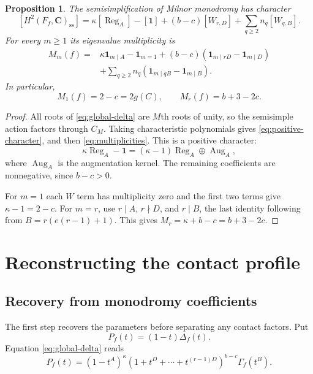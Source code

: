 \documentclass[11pt]{article}
\numberwithin{equation}{section}
\newtheorem{proposition}[theorem]{Proposition}
\theoremstyle{definition}
\theoremstyle{remark}
\newcommand{\CC}{\mathbf C}
\newcommand{\one}{\mathbf 1}
\newcommand{\Reg}{\operatorname{Reg}}
\newcommand{\Aug}{\operatorname{Aug}}
\begin{document}
\begin{proposition}\label{prop:characters}
The semisimplification of Milnor monodromy has character
\begin{equation}\label{eq:positive-character}
 [H^2(F_f,\CC)_{\mathrm{ss}}]
   =\kappa[\Reg_A]-[\one]+(b-c)[W_{r,D}]
                 +\sum_{q\ge2}n_q[W_{q,B}].
\end{equation}
For every $m\ge1$ its eigenvalue multiplicity is
\begin{equation}\label{eq:multiplicities}
 \begin{aligned}
 M_m(f)={}&\kappa\one_{m\mid A}-\one_{m=1}
   +(b-c)(\one_{m\mid rD}-\one_{m\mid D})\\
 &+\sum_{q\ge2}n_q(\one_{m\mid qB}-\one_{m\mid B}).
 \end{aligned}
\end{equation}
In particular,
\begin{equation}\label{eq:m1-mr}
 M_1(f)=2-c=2g(C),\qquad M_r(f)=b+3-2c.
\end{equation}
\end{proposition}

\begin{proof}
All roots of \eqref{eq:global-delta} are $M$th roots of unity,
so the semisimple action factors through $C_M$. Taking
characteristic polynomials gives \eqref{eq:positive-character},
and then \eqref{eq:multiplicities}. This is a positive character:
\[
 \kappa\Reg_A-\one
    =(\kappa-1)\Reg_A\oplus\Aug_A,
\]
where $\Aug_A$ is the augmentation kernel. The remaining
coefficients are nonnegative, since $b-c>0$.

For $m=1$ each $W$ term has multiplicity zero and the first
two terms give $\kappa-1=2-c$. For $m=r$, use
$r\mid A$, $r\nmid D$, and $r\mid B$, the last identity following
from $B=r(e(r-1)+1)$. This gives
$M_r=\kappa+b-c=b+3-2c$.
\end{proof}

\section{Reconstructing the contact profile}\label{sec:reconstruction}

\subsection{Recovery from monodromy coefficients}

The first step recovers the parameters before separating any
contact factors. Put
\[
 P_f(t)=(1-t)\Delta_f(t).
\]
Equation \eqref{eq:global-delta} reads
\begin{equation}\label{eq:p-factorization}
 P_f(t)=(1-t^A)^\kappa
       (1+t^D+\cdots+t^{(r-1)D})^{b-c}\Gamma_f(t^B).
\end{equation}
\end{document}

